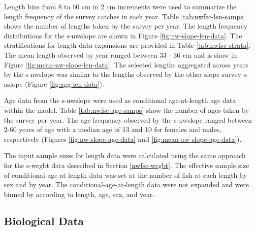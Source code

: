 \documentclass[11pt,
  english,
  a4paper,
]{article}
\begin{document}
Length bins from 8 to 60 cm in 2 cm increments were used to summarize the length frequency of the survey catches in each year. Table \ref{tab:nwfsc-len-samps} shows the number of lengths taken by the survey per year. The length frequency distributions for the \gls{s-nwslope} are shown in Figure \ref{fig:nw-slope-len-data}. The stratifications for length data expansions are provided in Table \ref{tab:nwfsc-strata}. The mean length observed by year ranged between 33 - 36 cm and is show in Figure \ref{fig:mean-nw-slope-len-data}. The selected lengths aggregated across years by the \gls{s-nwslope} was similar to the lengths observed by the other slope survey \gls{s-aslope} (Figure \ref{fig:agg-len-data}).

\leavevmode\tagmcend\tagstructend\par


Age data from the \gls{s-nwslope} were used as conditional age-at-length age data within the model. Table \ref{tab:nwfsc-age-samps} show the number of ages taken by the survey per year. The age frequency observed by the \gls{s-nwslope} ranged between 2-60 years of age with a median age of 13 and 10 for females and males, respectively (Figures \ref{fig:nw-slope-age-data} and \ref{fig:mean-nw-slope-age-data}).

\leavevmode\tagmcend\tagstructend\par


The input sample sizes for length data were calculated using the same approach for the \gls{s-wcgbt} data described in Section \ref{nwfsc-wcgbt}. The effective sample size of conditional-age-at-length data was set at the number of fish at each length by sex and by year. The conditional-age-at-length data were not expanded and were binned by according to length, age, sex, and year.

\leavevmode\tagmcend\tagstructend\par


\hypertarget{biological-data}{%
\subsection{Biological Data}\label{biological-data}}

\leavevmode\tagmcend\tagstructend

\end{document}
